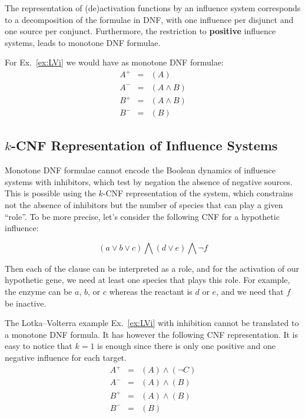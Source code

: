\documentclass{llncs}
\begin{document}
The representation of (de)activation functions by an influence system 
corresponds to a decomposition of the formulae in DNF, 
with one influence per disjunct and one source per conjunct.
Furthermore, the restriction to \textbf{positive} influence systems, leads to monotone DNF formulae.

\begin{example}

For Ex.~\ref{ex:LVi} we would have as monotone DNF formulae:
\begin{eqnarray*}
   A^+&=&(A)\\
   A^-&=&(A \wedge B)\\
   B^+&=&(A\wedge B)\\
   B^-&=&(B)
\end{eqnarray*}

\end{example}


\subsection{$k$-CNF Representation of Influence Systems}

Monotone DNF formulae cannot encode the Boolean dynamics of influence systems with inhibitors, which test by negation the absence of negative sources.
This is possible using the $k$-CNF representation of the system, which constrains not the absence of inhibitors but the number of species that can play a given ``role''. To be more precise, let's consider the following CNF for a hypothetic influence:

\[
\left(a \vee b \vee c\right) \bigwedge
\left(d \vee e\right) \bigwedge 
\neg f
\]

Then each of the clause can be interpreted as a role, and for the activation of our hypothetic gene, we need at least one species that plays this role. For example, the enzyme can be $a$, $b$, or $c$ whereas 
the reactant is $d$ or $e$, and we need that $f$ be inactive.


\begin{example}
   The Lotka--Volterra example Ex.~\ref{ex:LVi} with inhibition cannot be
   translated to a monotone DNF formula. It has however the following CNF
   representation. It is easy to
   notice that $k=1$ is enough since there is only one positive and one
   negative influence for each target.
\begin{eqnarray*}
   A^+&=&(A)\wedge(\neg C)\\
A^-&=&(A) \wedge (B)\\
B^+&=&(A)\wedge (B)\\
   B^-&=&(B)
\end{eqnarray*}

\end{example}
\end{document}
